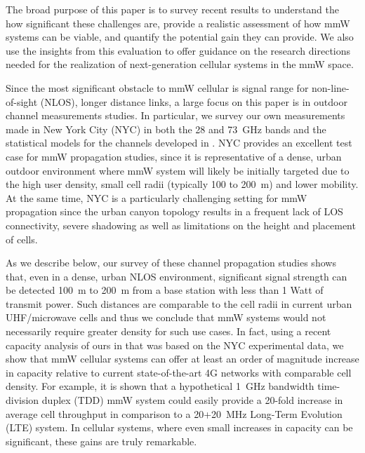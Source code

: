 \documentclass[journal]{IEEEtran}
\begin{document}
The broad purpose of this paper is to survey recent results
to understand the how significant these challenges are,
provide a realistic assessment of how mmW systems can be viable,
and quantify the potential gain they can provide.  We also use the insights
from this evaluation to offer guidance on the research directions needed
for the realization of next-generation cellular systems in the mmW space.

Since the most significant obstacle to mmW cellular is signal
range for non-line-of-sight (NLOS), longer distance links,
a large focus on this paper is in outdoor channel measurements studies.
In particular, we survey our own measurements
\cite{ben2011millimeter,Rappaport:12-28G,Rappaport:28NYCPenetrationLoss,Samimi:AoAD,Nie72G-PIMRC:13,Rappaport:13-BBmmW,rappaportmillimeter}
made in New York City (NYC) in both the 28 and 73~GHz bands
and the statistical models for the channels developed in \cite{AkLiuRanRapEr:13-arxiv}.
NYC provides an excellent test case for mmW propagation studies, since
it is representative of a dense, urban outdoor environment
where mmW system will likely be initially targeted due to the high user
density, small cell radii (typically 100 to 200~m) and lower mobility.
At the same time, NYC is a particularly challenging setting for
mmW propagation since the urban canyon topology
results in a frequent lack of LOS connectivity, severe shadowing
as well as limitations on the height and placement of cells.

As we describe below, our survey of these channel propagation studies shows that,
even in a dense, urban NLOS environment, significant
signal strength can be detected 100~m to 200~m from a base station with
less than 1 Watt of transmit power.  Such distances are comparable to
the cell radii in current urban UHF/microwave cells
and thus we conclude that mmW systems would not necessarily require
greater density for such use cases.
In fact, using a recent capacity analysis of ours in
\cite{AkLiuRanRapEr:13-arxiv} that was based on the NYC experimental data,
we show that mmW cellular systems can offer at least an
order of magnitude increase in capacity relative
to current state-of-the-art 4G networks with comparable cell density.
For example, it is shown that a hypothetical
1~GHz bandwidth time-division duplex (TDD) mmW system could easily provide a 20-fold increase
in average cell throughput in comparison to a 20+20~MHz Long-Term Evolution (LTE) system.
In cellular systems, where even small increases in capacity can be significant,
these gains are truly remarkable.
\end{document}
